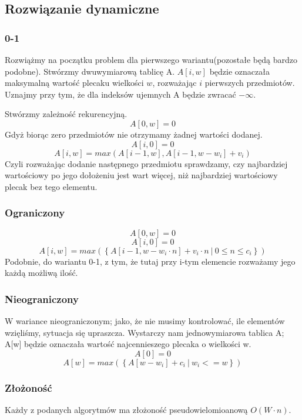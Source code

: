 \subsection{Rozwiązanie dynamiczne}
\subsubsection{0-1}
Rozwiążmy na początku problem dla pierwszego wariantu(pozostałe będą bardzo podobne).
Stwórzmy dwuwymiarową tablicę A.
$A[i, w]$ będzie oznaczała maksymalną wartość plecaku wielkości $w$, rozważając $i$ pierwszych przedmiotów.
Uznajmy przy tym, że dla indeksów ujemnych A będzie zwracać $-\infty$.

Stwórzmy zależność rekurencyjną.
\[A[0, w] = 0\]
Gdyż biorąc zero przedmiotów nie otrzymamy żadnej wartości dodanej.
\[A[i, 0] = 0\]
\[A[i, w] = max(A[i - 1, w], A[i - 1, w - w_i] + v_i)\]
Czyli rozważając dodanie następnego przedmiotu sprawdzamy, czy najbardziej wartościowy po jego dołożeniu jest wart więcej, niż najbardziej wartościowy plecak bez tego elementu.

\subsubsection{Ograniczony}
\[A[0, w] = 0\]
\[A[i, 0] = 0\]
\[A[i, w] = max(\left \{ A[i - 1, w - w_i \cdot n] + v_i \cdot n ~|~ 0 \leq n \leq c_i \right \})\]
Podobnie, do wariantu 0-1, z tym, że tutaj przy i-tym elemencie rozważamy jego każdą możliwą ilość.

\subsubsection{Nieograniczony}
W wariance nieograniczonym; jako, że nie musimy kontrolować, ile elementów wzięliśmy, sytuacja się upraszcza.
Wystarczy nam jednowymiarowa tablica A; A[w] będzie oznaczała wartość najcennieszego plecaka o wielkości w.
\[A[0] = 0\]
\[A[w] = max(\left \{ A[w - w_i] + c_i ~|~ w_i <= w \right \})\]

\subsubsection{Złożoność}
Każdy z podanych algorytmów ma złożoność pseudowielomioanową $O(W \cdot n)$.
